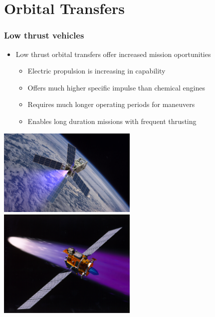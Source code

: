 
\section{Orbital Transfers}

\begin{frame} \label{slide:lowthrust_vehicles}%
\frametitle{Low thrust vehicles} %
\begin{itemize}
    \item Low thrust orbital transfers offer increased mission oportunities
    \begin{itemize}
        \item Electric propulsion is increasing in capability
        \item Offers much higher specific impulse than chemical engines 
        \item Requires much longer operating periods for maneuvers 
        \item Enables long duration missions with frequent thrusting
    \end{itemize}
\end{itemize}

\begin{center}
    \includegraphics[height=0.4\textheight,width=0.5\textwidth,keepaspectratio]{figures/defense/patriot_plume.jpg}
    ~
    \includegraphics[height=0.4\textheight,width=0.5\textwidth,keepaspectratio]{figures/defense/deepspace1.jpg}
\end{center}
\hyperlink{slide:propulsion}{}
\end{frame}   %

